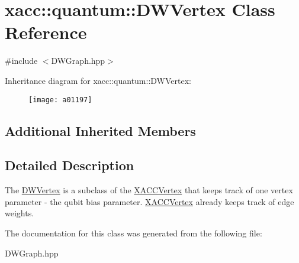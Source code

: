 \hypertarget{a01197}{}\section{xacc\+:\+:quantum\+:\+:D\+W\+Vertex Class Reference}
\label{a01197}


{\ttfamily \#include $<$D\+W\+Graph.\+hpp$>$}

Inheritance diagram for xacc\+:\+:quantum\+:\+:D\+W\+Vertex\+:\begin{figure}[H]
\begin{center}
\leavevmode
\texttt{[image: a01197]}
\end{center}
\end{figure}
\subsection*{Additional Inherited Members}


\subsection{Detailed Description}
The \hyperlink{a01197}{D\+W\+Vertex} is a subclass of the \hyperlink{a01701}{X\+A\+C\+C\+Vertex} that keeps track of one vertex parameter -\/ the qubit bias parameter. \hyperlink{a01701}{X\+A\+C\+C\+Vertex} already keeps track of edge weights. 

The documentation for this class was generated from the following file\+:\begin{DoxyCompactItemize}
\item 
D\+W\+Graph.\+hpp\end{DoxyCompactItemize}
